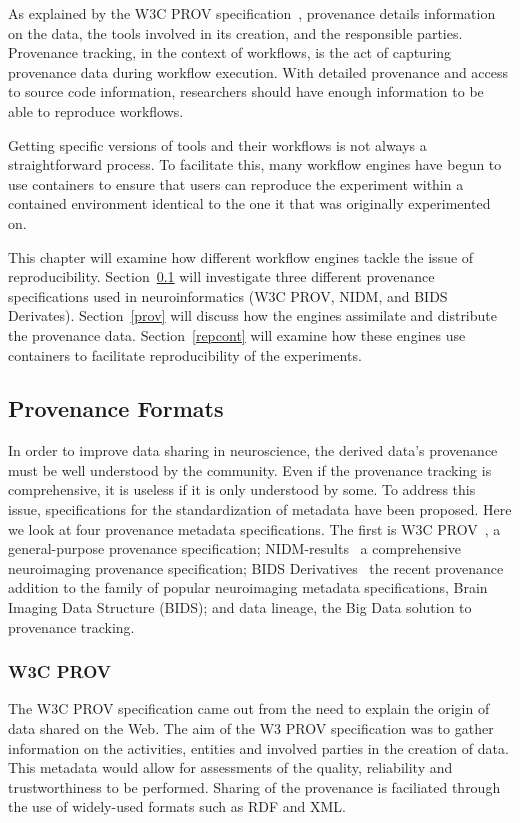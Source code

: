             As explained by the W3C PROV specification~\cite{missier2013w3c},
            provenance details information on the data, the tools involved in
            its creation, and the responsible parties. Provenance tracking, in
            the context of workflows, is the act of capturing provenance data
            during workflow execution. With detailed provenance and access to
            source code information, researchers should have enough information
            to be able to reproduce workflows. 

        Getting specific versions of tools and their workflows is not always a
        straightforward process. To facilitate this, many workflow engines have
        begun to use containers to ensure that users can reproduce the
        experiment within a contained environment identical to the one it that
        was originally experimented on. 

        This chapter will examine how different workflow engines tackle the
        issue of reproducibility. Section~\ref{metadata} will investigate three
        different provenance specifications used in neuroinformatics (W3C PROV,
        NIDM, and BIDS Derivates). Section~\ref{prov} will discuss how the
        engines assimilate and distribute the provenance data.
        Section~\ref{repcont} will examine how these engines use containers to
        facilitate reproducibility of the experiments. \subsection{Provenance
        Formats}\label{metadata} In order to improve data sharing in
        neuroscience, the derived data's provenance must be well understood by
        the community. Even if the provenance tracking is comprehensive, it is
        useless if it is only understood by some. To address this issue,
        specifications for the standardization of metadata have been proposed.
        Here we look at four provenance metadata specifications. The first is
        W3C PROV~\cite{missier2013w3c}, a general-purpose provenance
        specification; NIDM-results~\cite{Maumet:2016aa} a comprehensive
        neuroimaging provenance specification; BIDS Derivatives~\cite{bidsderiv}
        the recent provenance addition to the family of popular neuroimaging
        metadata specifications, Brain Imaging Data Structure (BIDS); and data
        lineage, the Big Data solution to provenance tracking.

            \subsubsection{W3C PROV}
            The W3C PROV specification came out from the need to explain the
            origin of data shared on the Web. The aim of the W3 PROV
            specification was to gather information on the activities, entities
            and involved parties in the creation of data. This metadata would
            allow for assessments of the quality, reliability and
            trustworthiness to be performed. Sharing of the provenance is
            faciliated through the use of widely-used formats such as RDF and
            XML. 

